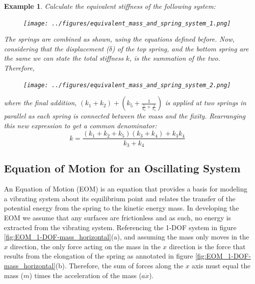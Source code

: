 \documentclass[12pt,letter]{article}
\newtheorem{ex}{Example}
\numberwithin{ex}{section} %
\newenvironment{example}{\begin{mdframed}[middlelinewidth=0.5mm]\begin{ex}\normalfont}{\end{ex}\end{mdframed}}
\numberwithin{re}{section} %
\numberwithin{vcs}{section} %
\begin{document}
			\begin{example}

				Calculate the equivalent stiffness of the following system:
				\begin{figure}[H]
					\centering
					\texttt{[image: ../figures/equivalent\_mass\_and\_spring\_system\_1.png]}
				\end{figure}	
				The springs are combined as shown, using the equations defined before.  Now, considering that the displacement ($\delta$) of the top spring, and the bottom spring are the same we can state the total stiffness $k$, is the summation of the two. Therefore,    
				\begin{figure}[H]
					\centering
					\texttt{[image: ../figures/equivalent\_mass\_and\_spring\_system\_2.png]}
				\end{figure}	
				\noindent where the final addition, $(k_1+k_2) + (k_5+\frac{1}{\frac{1}{k_3}+\frac{1}{k_4}})$ is applied at two springs in parallel as each spring is connected between the mass and the fixity. Rearranging this new expression to get a common denominator:
				\begin{equation}
					k= \frac{(k_1+k_2+k_5)(k_3+k_4)+k_3k_4}{k_3+k_4}  
				\end{equation}				
			\end{example}	

					
	\subsection{Equation of Motion for an Oscillating System}			
			
        An Equation of Motion (EOM) is an equation that provides a basis for modeling a vibrating system about its equilibrium point and relates the transfer of the potential energy from the spring to the kinetic energy mass. In developing the EOM we assume that any surfaces are frictionless and as such, no energy is extracted from the vibrating system. Referencing the 1-DOF system in figure \ref{fig:EOM_1-DOF-mass_horizontal}(a), and assuming the mass only moves in the $x$ direction, the only force acting on the mass in the $x$ direction is the force that results from the elongation of the spring as annotated in figure \ref{fig:EOM_1-DOF-mass_horizontal}(b). Therefore, the sum of forces along the $x$ axis must equal the mass ($m$) times the acceleration of the mass ($a\dot{x}$). 
\end{document}
